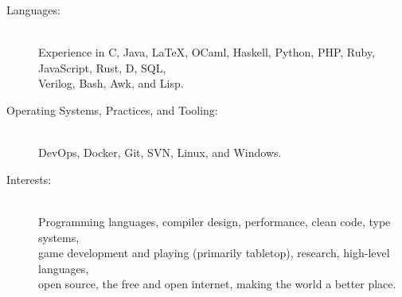\documentclass[10pt,letterpaper]{article}
\newenvironment{indentsection}[1]%
{\begin{list}{}%
  {\setlength{\leftmargin}{#1}}%
  \item[]%
}
{\end{list}}
\newcommand{\CPP}
{C\nolinebreak[4]\hspace{-.05em}\raisebox{.22ex}{\footnotesize\bf ++}}
\begin{document}
\begin{indentsection}{\parindent}
\begin{description}
  \item[Languages:] \ \\
  Experience in \CPP , Java, \LaTeX, OCaml, Haskell, Python, PHP, Ruby, JavaScript, Rust, D, SQL, \\  Verilog, Bash, Awk, and Lisp.
  \item[Operating Systems, Practices, and Tooling:] \ \\
  DevOps, Docker, Git, SVN, Linux, and Windows.
  \item[Interests:] \ \\
  Programming languages, compiler design, performance, clean code, type systems, \\ game development and playing (primarily tabletop), research, high-level languages, \\ open source, the free and open internet, making the world a better place.
\end{description}
\end{indentsection}
\end{document}
